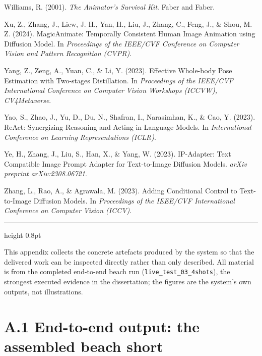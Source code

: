 \documentclass[10pt,twocolumn,letterpaper]{article}
\begin{document}
Williams, R. (2001). \emph{The Animator's Survival Kit}. Faber and Faber.

Xu, Z., Zhang, J., Liew, J. H., Yan, H., Liu, J., Zhang, C., Feng, J., \& Shou, M. Z. (2024). MagicAnimate: Temporally Consistent Human Image Animation using Diffusion Model. In \emph{Proceedings of the IEEE/CVF Conference on Computer Vision and Pattern Recognition (CVPR)}.

Yang, Z., Zeng, A., Yuan, C., \& Li, Y. (2023). Effective Whole-body Pose Estimation with Two-stages Distillation. In \emph{Proceedings of the IEEE/CVF International Conference on Computer Vision Workshops (ICCVW), CV4Metaverse}.

Yao, S., Zhao, J., Yu, D., Du, N., Shafran, I., Narasimhan, K., \& Cao, Y. (2023). ReAct: Synergizing Reasoning and Acting in Language Models. In \emph{International Conference on Learning Representations (ICLR)}.

Ye, H., Zhang, J., Liu, S., Han, X., \& Yang, W. (2023). IP-Adapter: Text Compatible Image Prompt Adapter for Text-to-Image Diffusion Models. \emph{arXiv preprint arXiv:2308.06721}.

Zhang, L., Rao, A., \& Agrawala, M. (2023). Adding Conditional Control to Text-to-Image Diffusion Models. In \emph{Proceedings of the IEEE/CVF International Conference on Computer Vision (ICCV)}.

\par\vspace{22pt}

\vspace*{2pt}\vspace{3pt}\hrule height 0.8pt\vspace{12pt}

This appendix collects the concrete artefacts produced by the system so that the delivered work can be inspected directly rather than only described. All material is from the completed end-to-end beach run (\texttt{live\_test\_03\_4shots}), the strongest executed evidence in the dissertation; the figures are the system's own outputs, not illustrations.


\section*{A.1 End-to-end output: the assembled beach short}
\end{document}
